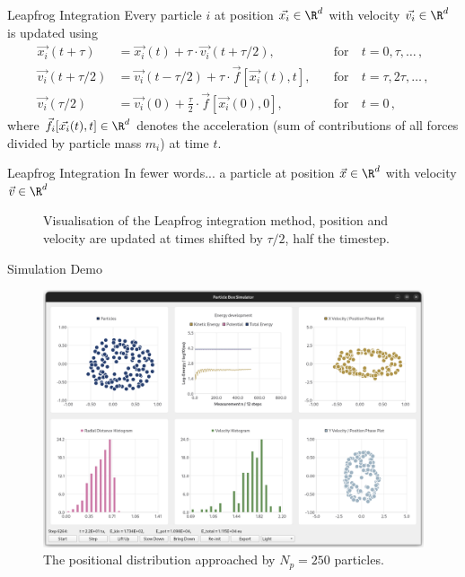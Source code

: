 \documentclass[aspectratio=169, hyperref={colorlinks=true}]{beamer}
\begin{document}
  \begin{frame}{Leapfrog Integration}
    Every particle $i$ at position $\vec{x_i} \in \R^d$ with velocity $\vec{v_i} \in \R^d$ is updated using
    \begin{align*}
      \vec{x_i}(t+\tau)     & = \vec{x_i}(t)+\tau \cdot \vec{v_i}(t+\tau / 2),              & \quad\text{for}~ & t=0, \tau, \ldots\,,      \\
      \vec{v_i}(t+\tau / 2) & = \vec{v_i}(t-\tau/2) + \tau \cdot \vec{f}[\vec{x_i}(t), t],  & \quad\text{for}~ & t=\tau, 2 \tau, \ldots\,, \\
      \vec{v_i}(\tau / 2)   & = \vec{v_i}(0)+\frac{\tau}{2} \cdot \vec{f}[\vec{x_i}(0), 0], & \quad\text{for}~ & t=0\,,
    \end{align*}
    where $\vec{f_i}[\vec{x_i}(t), t] \in \R^d$ denotes the acceleration (sum of contributions of all forces divided by particle mass $m_i$) at time $t$.
  \end{frame}

  \begin{frame}{Leapfrog Integration}
    In fewer words... a particle at position $\vec{x} \in \R^d$ with velocity $\vec{v} \in \R^d$
    \begin{figure}[H]
      \centering
      \caption[Leapfrog Visualisation]{Visualisation of the Leapfrog integration method, position and velocity are updated at times shifted by $\tau/2$, half the timestep.}
      \label{fig:leapfrog}
    \end{figure}
  \end{frame}

  \begin{frame}{Simulation Demo}
    \begin{figure}
      \centering
      \includegraphics[width=0.64\linewidth]{gui-screenshot.png}
      \caption*{The positional distribution approached by $N_p = 250$ particles.}
    \end{figure}
  \end{frame}
\end{document}
